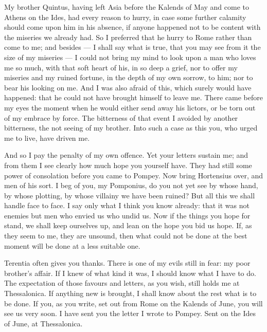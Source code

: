 

 My brother Quintus, having left Asia before the Kalends of May and come to Athens on the Ides, had every reason to hurry, in case some further calamity should come upon him in his absence, if anyone happened not to be content with the miseries we already had. So I preferred that he hurry to Rome rather than come to me; and besides --- I shall say what is true, that you may see from it the size of my miseries --- I could not bring my mind to look upon a man who loves me so much, with that soft heart of his, in so deep a grief, nor to offer my miseries and my ruined fortune, in the depth of my own sorrow, to him; nor to bear his looking on me. And I was also afraid of this, which surely would have happened: that he could not have brought himself to leave me. There came before my eyes the moment when he would either send away his lictors, or be torn out of my embrace by force. The bitterness of that event I avoided by another bitterness, the not seeing of my brother. Into such a case as this you, who urged me to live, have driven me.

 And so I pay the penalty of my own offence. Yet your letters sustain me; and from them I see clearly how much hope you yourself have. They had still some power of consolation before you came to Pompey. Now bring Hortensius over, and men of his sort. I beg of you, my Pomponius, do you not yet see by whose hand, by whose plotting, by whose villainy we have been ruined? But all this we shall handle face to face. I say only what I think you know already: that it was not enemies but men who envied us who undid us. Now if the things you hope for stand, we shall keep ourselves up, and lean on the hope you bid us hope. If, as they seem to me, they are unsound, then what could not be done at the best moment will be done at a less suitable one.

 Terentia often gives you thanks. There is one of my evils still in fear: my poor brother's affair. If I knew of what kind it was, I should know what I have to do. The expectation of those favours and letters, as you wish, still holds me at Thessalonica. If anything new is brought, I shall know about the rest what is to be done. If you, as you write, set out from Rome on the Kalends of June, you will see us very soon. I have sent you the letter I wrote to Pompey. Sent on the Ides of June, at Thessalonica.
